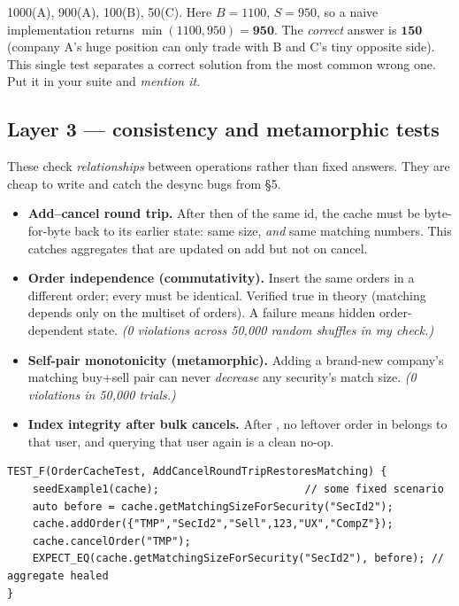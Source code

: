 \begin{keybox}
\Buy{}1000(A), \Sell{}900(A), \Buy{}100(B), \Sell{}50(C). Here $B{=}1100$,
$S{=}950$, so a naive implementation returns $\min(1100,950){=}\mathbf{950}$. The
\emph{correct} answer is $\mathbf{150}$ (company A's huge position can only trade
with B and C's tiny opposite side). This single test separates a correct solution
from the most common wrong one. Put it in your suite and \emph{mention it}.
\end{keybox}

\subsection{Layer 3 --- consistency and metamorphic tests}

These check \emph{relationships} between operations rather than fixed answers.
They are cheap to write and catch the desync bugs from \S5.

\begin{itemize}[leftmargin=1.5em]
  \item \textbf{Add--cancel round trip.} After  then
         of the same id, the cache must be byte-for-byte back to
        its earlier state: same  size, \emph{and} same matching
        numbers. This catches aggregates that are updated on add but not on cancel.
  \item \textbf{Order independence (commutativity).} Insert the same orders in a
        different order; every  must be identical.
        Verified true in theory (matching depends only on the multiset of orders).
        A failure means hidden order-dependent state. \emph{(0 violations across
        50{,}000 random shuffles in my check.)}
  \item \textbf{Self-pair monotonicity (metamorphic).} Adding a brand-new
        company's matching buy+sell pair can never \emph{decrease} any security's
        match size. \emph{(0 violations in 50{,}000 trials.)}
  \item \textbf{Index integrity after bulk cancels.} After
        , no leftover order in 
        belongs to that user, and querying that user again is a clean no-op.
\end{itemize}

\begin{lstlisting}
TEST_F(OrderCacheTest, AddCancelRoundTripRestoresMatching) {
    seedExample1(cache);                       // some fixed scenario
    auto before = cache.getMatchingSizeForSecurity("SecId2");
    cache.addOrder({"TMP","SecId2","Sell",123,"UX","CompZ"});
    cache.cancelOrder("TMP");
    EXPECT_EQ(cache.getMatchingSizeForSecurity("SecId2"), before); // aggregate healed
}
\end{lstlisting}


